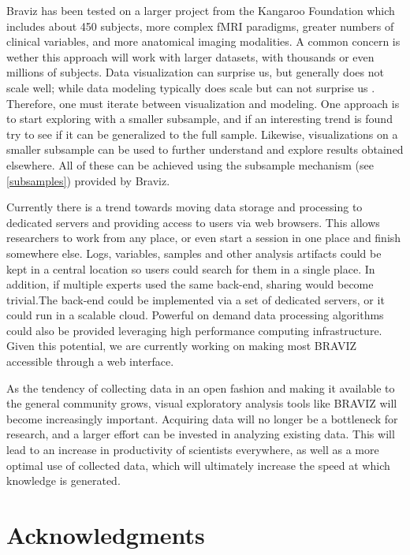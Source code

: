 \documentclass{frontiersHLTH}
\begin{document}
Braviz has been tested on a larger project from the Kangaroo Foundation which includes about 450 subjects, more complex fMRI paradigms, greater numbers of clinical variables, and more anatomical imaging modalities. A common concern is wether this approach will work with larger datasets, with thousands or even millions of subjects. Data visualization can surprise us, but generally does not scale well; while data modeling typically does scale but can not surprise us \cite{grolemund_r_2016}. Therefore, one must iterate between visualization and modeling. One approach is to start exploring with a smaller subsample, and if an interesting trend is found try to see if it can be generalized to the full sample. Likewise, visualizations on a smaller subsample can be used to further understand and explore results obtained elsewhere. All of these can be achieved using the subsample mechanism (see \ref{subsamples}) provided by Braviz.
  
Currently there is a trend towards moving data storage and processing to dedicated servers and providing access to users via web browsers. This allows researchers to work from any place, or even start a session in one place and finish somewhere else. Logs, variables, samples and other analysis artifacts could be kept in a central location so users could search for them in a single place. In addition, if multiple experts used the same back-end, sharing would become trivial.The back-end could be implemented via a set of dedicated servers, or it could run in a scalable cloud. Powerful on demand data processing algorithms could also be provided leveraging high performance computing infrastructure. Given this potential, we are currently working on making most BRAVIZ accessible through a web interface. 

As the tendency of collecting data in an open fashion and making it available to the general community grows, visual exploratory analysis tools like BRAVIZ  will become increasingly important. Acquiring data will no longer be a bottleneck for research, and a larger effort can be invested in analyzing existing data. This will lead to an increase in productivity of scientists everywhere, as well as a more optimal use of collected data, which will ultimately increase the speed at which knowledge is generated.

\section*{Acknowledgments}
\end{document}
